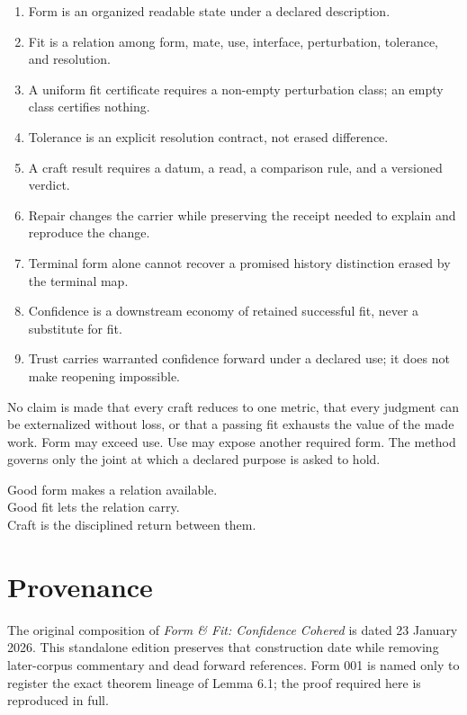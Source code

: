 \documentclass[11pt]{article}
\begin{document}
\begin{enumerate}
\item Form is an organized readable state under a declared description.
\item Fit is a relation among form, mate, use, interface, perturbation, tolerance, and resolution.
\item A uniform fit certificate requires a non-empty perturbation class; an empty class certifies nothing.
\item Tolerance is an explicit resolution contract, not erased difference.
\item A craft result requires a datum, a read, a comparison rule, and a versioned verdict.
\item Repair changes the carrier while preserving the receipt needed to explain and reproduce the change.
\item Terminal form alone cannot recover a promised history distinction erased by the terminal map.
\item Confidence is a downstream economy of retained successful fit, never a substitute for fit.
\item Trust carries warranted confidence forward under a declared use; it does not make reopening impossible.
\end{enumerate}

No claim is made that every craft reduces to one metric, that every judgment can be externalized without loss, or that a passing fit exhausts the value of the made work. Form may exceed use. Use may expose another required form. The method governs only the joint at which a declared purpose is asked to hold.

\begin{lawbox}
\centering
Good form makes a relation available.\\
Good fit lets the relation carry.\\
Craft is the disciplined return between them.
\end{lawbox}

\section*{Provenance}

The original composition of \emph{Form \& Fit: Confidence Cohered} is dated 23 January 2026. This standalone edition preserves that construction date while removing later-corpus commentary and dead forward references. Form 001 is named only to register the exact theorem lineage of Lemma 6.1; the proof required here is reproduced in full.
\end{document}
